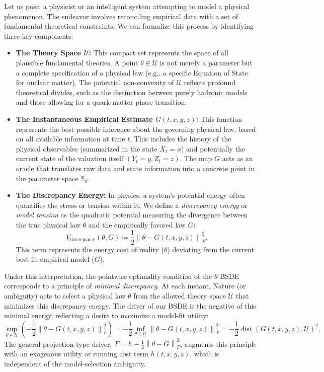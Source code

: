 \documentclass[12pt, letterpaper]{amsart}
\newcommand{\Ucal}{\mathcal{U}}
\newcommand{\Sd}{\mathbb{S}_d}
\newcommand{\norm}[1]{\left\lVert#1\right\rVert}
\DeclareMathOperator*{\dist}{dist}
\theoremstyle{plain}
\theoremstyle{definition}
\theoremstyle{remark}
\numberwithin{equation}{section} %
\begin{document}
Let us posit a physicist or an intelligent system attempting to model a physical phenomenon. The endeavor involves reconciling empirical data with a set of fundamental theoretical constraints. We can formalize this process by identifying three key components:

\begin{itemize}
    \item \textbf{The Theory Space $\Ucal$:} This compact set represents the space of all plausible fundamental theories. A point $\theta \in \Ucal$ is not merely a parameter but a complete specification of a physical law (e.g., a specific Equation of State for nuclear matter). The potential non-convexity of $\Ucal$ reflects profound theoretical divides, such as the distinction between purely hadronic models and those allowing for a quark-matter phase transition.

    \item \textbf{The Instantaneous Empirical Estimate $G(t,x,y,z)$:} This function represents the best possible inference about the governing physical law, based on all available information at time $t$. This includes the history of the physical observables (summarized in the state $X_t=x$) and potentially the current state of the valuation itself $(Y_t=y, Z_t=z)$. The map $G$ acts as an oracle that translates raw data and state information into a concrete point in the parameter space $\Sd$.

    \item \textbf{The Discrepancy Energy:} In physics, a system's potential energy often quantifies the stress or tension within it. We define a \emph{discrepancy energy} or \emph{model tension} as the quadratic potential measuring the divergence between the true physical law $\theta$ and the empirically favored law $G$:
    \[
        V_{\text{discrepancy}}(\theta, G) \coloneqq \frac{1}{2}\norm{\theta - G(t,x,y,z)}_F^2.
    \]
    This term represents the energy cost of reality ($\theta$) deviating from the current best-fit empirical model ($G$).
\end{itemize}

Under this interpretation, the pointwise optimality condition of the \(\theta\)-BSDE corresponds to a principle of \emph{minimal discrepancy}. At each instant, Nature (or ambiguity) acts to select a physical law $\theta$ from the allowed theory space $\Ucal$ that minimizes this discrepancy energy. The driver of our BSDE is the negative of this minimal energy, reflecting a desire to maximize a model-fit utility:
\[
 \sup_{\theta \in \Ucal} \left( -\frac{1}{2}\norm{\theta - G(t,x,y,z)}_F^2 \right) = -\frac{1}{2} \inf_{\theta \in \Ucal} \norm{\theta - G(t,x,y,z)}_F^2 = -\frac{1}{2}\dist(G(t,x,y,z), \Ucal)^2.
\]
The general projection-type driver, $F = h - \frac{1}{2}\norm{\theta - G}_F^2$, augments this principle with an exogenous utility or running cost term $h(t,x,y,z)$, which is independent of the model-selection ambiguity.
\end{document}
